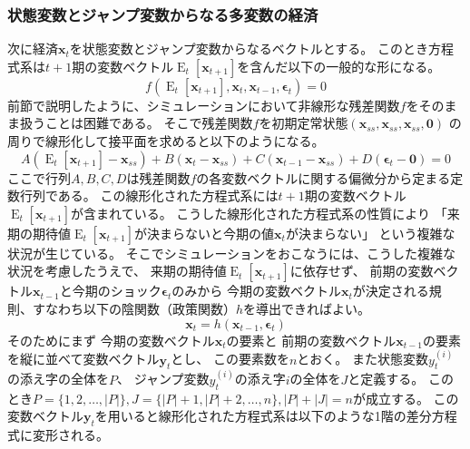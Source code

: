 \subsubsection{状態変数とジャンプ変数からなる多変数の経済}
\label{sec:chapter4_method_multivariable}
次に経済\(\mathbf{x}_t\)を状態変数とジャンプ変数からなるベクトルとする。
このとき方程式系は\(t+1\)期の変数ベクトル\(\operatorname{E}_t[\mathbf{x}_{t+1}]\)を含んだ以下の一般的な形になる。
\begin{equation}
\label{form:chapter4_method_multivariable_system_with_expectation}
    f(\operatorname{E}_t[\mathbf{x}_{t+1}],\mathbf{x}_t,\mathbf{x}_{t-1},\mathbf{\epsilon}_t)=0
\end{equation}
前節で説明したように、シミュレーションにおいて非線形な残差関数\(f\)をそのまま扱うことは困難である。
そこで残差関数\(f\)を初期定常状態\((\mathbf{x}_{ss},\mathbf{x}_{ss},\mathbf{x}_{ss},\mathbf{0})\)
の周りで線形化して接平面を求めると以下のようになる。
\begin{equation}
\label{form:chapter4_method_linearized_system}
    A(\operatorname{E}_t[\mathbf{x}_{t+1}]-\mathbf{x}_{ss})+B(\mathbf{x}_t-\mathbf{x}_{ss})+C(\mathbf{x}_{t-1}-\mathbf{x}_{ss})+D(\mathbf{\epsilon}_t-\mathbf{0})=0
\end{equation}
ここで行列\(A,B,C,D\)は残差関数\(f\)の各変数ベクトルに関する偏微分から定まる定数行列である。
この線形化された方程式系には\(t+1\)期の変数ベクトル\(\operatorname{E}_t[\mathbf{x}_{t+1}]\)が含まれている。
こうした線形化された方程式系の性質により
「来期の期待値\(\operatorname{E}_t[\mathbf{x}_{t+1}]\)が決まらないと今期の値\(\mathbf{x}_t\)が決まらない」
という複雑な状況が生じている。
そこでシミュレーションをおこなうには、こうした複雑な状況を考慮したうえで、
来期の期待値\(\operatorname{E}_t[\mathbf{x}_{t+1}]\)に依存せず、
前期の変数ベクトル\(\mathbf{x}_{t-1}\)と今期のショック\(\mathbf{\epsilon}_t\)のみから
今期の変数ベクトル\(\mathbf{x}_t\)が決定される規則、すなわち以下の陰関数（政策関数）\(h\)を導出できればよい。
\begin{equation}
\label{form:chapter4_method_implicit_h_multi}
    \mathbf{x}_t=h(\mathbf{x}_{t-1},\mathbf{\epsilon}_t)
\end{equation}
そのためにまず
今期の変数ベクトル\(\mathbf{x}_t\)の要素と
前期の変数ベクトル\(\mathbf{x}_{t-1}\)の要素を縦に並べて変数ベクトル\(\mathbf{y}_t\)とし、
この要素数を\(n\)とおく。
また状態変数\(y_t^{(i)}\)の添え字の全体を\(P\)、
ジャンプ変数\(y_t^{(i)}\)の添え字\(i\)の全体を\(J\)と定義する。
このとき\(P=\{1,2,\dots,|P|\},J=\{|P|+1,|P|+2,\dots,n\},|P|+|J|=n\)が成立する。
この変数ベクトル\(\mathbf{y}_t\)を用いると線形化された方程式系は以下のような1階の差分方程式に変形される。
